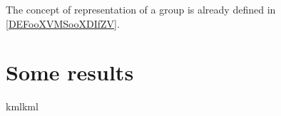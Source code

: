 The concept of representation of a group is already defined in \ref{DEFooXVMSooXDIfZV}.

\section{Some results}

kmlkml
